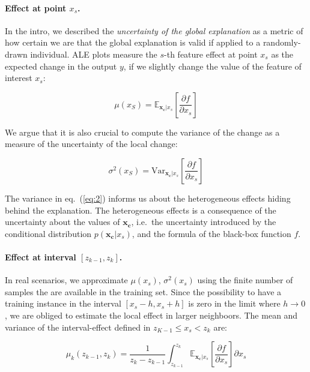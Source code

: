 \documentclass{article}
\begin{document}
\paragraph{Effect at point \(x_s\).} In the intro, we described the
\textit{uncertainty of the global explanation} as a metric of how
certain we are that the global explanation is valid if applied to a
randomly-drawn individual. ALE plots measure the \(s\)-th feature
effect at point \(x_s\) as the expected change in the output \(y\), if
we slightly change the value of the feature of interest \(x_s\):

\begin{equation}
  \label{eq:ALE_mean}
  \mu(x_S) = \mathbb{E}_{\mathbf{x_c}|x_s}\left [\frac{\partial
      f}{\partial x_s} \right ]
\end{equation}

\noindent
We argue that it is also crucial to compute the variance of the change
as a measure of the uncertainty of the local change:

\begin{equation}
  \label{eq:ALE_var}
  \sigma^2(x_S) = \mathrm{Var}_{\mathbf{x_c}|x_s}\left [\frac{\partial
      f}{\partial x_s} \right ]
\end{equation}

\noindent
The variance in eq.~(\ref{eq:2}) informs us about the heterogeneous
effects hiding behind the explanation. The heterogeneous effects is a
consequence of the uncertainty about the values of \(\mathbf{x_c}\),
i.e.~the uncertainty introduced by the conditional distribution
\(p(\mathbf{x_c}|x_s)\), and the formula of the black-box function
\(f\).

\paragraph{Effect at interval \([z_{k-1}, z_k]\).} In real scenarios,
we approximate \(\mu(x_s)\), \(\sigma^2(x_s)\) using the finite number
of samples the are available in the training set. Since the
possibility to have a training instance in the interval
\([x_s - h, x_s + h]\) is zero in the limit where \(h \to 0\), we are
obliged to estimate the local effect in larger neighboors. The mean
and variance of the interval-effect defined in
\(z_{K-1} \leq x_s < z_k\) are:

\begin{equation}
  \label{eq:ALE_expectation_bin}
  \mu_k(z_{k-1}, z_k) = \frac{1}{z_k - z_{k-1}}  \int_{z_{k-1}}^{z_k} \mathbb{E}_{\mathbf{x_c}|x_s}\left [\frac{\partial
      f}{\partial x_s} \right ] \partial x_s
\end{equation}
\end{document}

